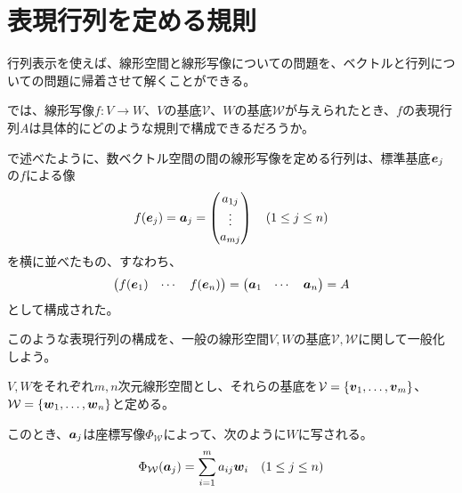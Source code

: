 \documentclass[../../../topic_linear-algebra]{subfiles}
\begin{document}
\sectionline
\section{表現行列を定める規則}\label{sec:construction-of-matrix-rep}

行列表示を使えば、線形空間と線形写像についての問題を、ベクトルと行列についての問題に帰着させて解くことができる。

では、線形写像$f\colon V \to W$、$V$の基底$\mathcal{V}$、$W$の基底$\mathcal{W}$が与えられたとき、$f$の表現行列$A$は具体的にどのような規則で構成できるだろうか。

\br

で述べたように、数ベクトル空間の間の線形写像を定める行列は、標準基底$\vb*{e}_j$の$f$による像
\begin{equation*}
  f(\vb*{e}_j) = \vb*{a}_j = \begin{pmatrix}
    a_{1j} \\
    \vdots \\
    a_{mj}
  \end{pmatrix} \quad (1 \leq j \leq n)
\end{equation*}
を横に並べたもの、すなわち、
\begin{equation*}
  \begin{pmatrix}
    f(\vb*{e}_1) & \cdots & f(\vb*{e}_n)
  \end{pmatrix} = \begin{pmatrix}
    \vb*{a}_1 & \cdots & \vb*{a}_n
  \end{pmatrix} = A
\end{equation*}
として構成された。

\br

このような表現行列の構成を、一般の線形空間$V,W$の基底$\mathcal{V}, \mathcal{W}$に関して一般化しよう。

\br

$V, W$をそれぞれ$m,n$次元線形空間とし、それらの基底を$\mathcal{V} = \{ \vb*{v}_1, \ldots, \vb*{v}_m \}$、$\mathcal{W} = \{ \vb*{w}_1, \ldots, \vb*{w}_n \}$と定める。

\br

このとき、$\vb*{a}_j$は座標写像$\Phi_{\mathcal{W}}$によって、次のように$W$に写される。
\begin{equation*}
  \Phi_{\mathcal{W}}(\vb*{a}_j) = \sum_{i=1}^m a_{ij} \vb*{w}_i \quad (1 \leq j \leq n)
\end{equation*}
\end{document}
